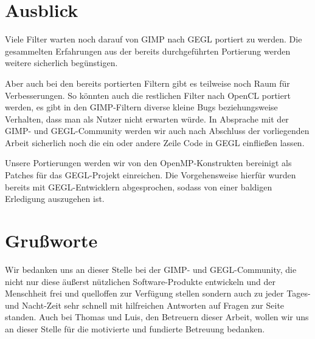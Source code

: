 \documentclass[10pt,a4paper]{article}
\begin{document}
\section{Ausblick}
Viele Filter warten noch darauf von GIMP nach GEGL portiert zu werden. Die gesammelten Erfahrungen aus der bereits durchgeführten Portierung werden weitere sicherlich begünstigen.

Aber auch bei den bereits portierten Filtern gibt es teilweise noch Raum für Verbesserungen. So könnten auch die restlichen Filter nach OpenCL portiert werden, es gibt in den GIMP-Filtern diverse kleine Bugs beziehungsweise Verhalten, dass man als Nutzer nicht erwarten würde. In Absprache mit der GIMP- und GEGL-Community werden wir auch nach Abschluss der vorliegenden Arbeit sicherlich noch die ein oder andere Zeile Code in GEGL einfließen lassen.

Unsere Portierungen werden wir von den OpenMP-Konstrukten bereinigt als Patches für das GEGL-Projekt einreichen. Die Vorgehensweise hierfür wurden bereits mit GEGL-Entwicklern abgesprochen, sodass von einer baldigen Erledigung auszugehen ist.
\section{Grußworte}
Wir bedanken uns an dieser Stelle bei der GIMP- und GEGL-Community, die nicht nur diese äußerst nützlichen Software-Produkte entwickeln und der Menschheit frei und quelloffen zur Verfügung stellen sondern auch zu jeder Tages- und Nacht-Zeit sehr schnell mit hilfreichen Antworten auf Fragen zur Seite standen. Auch bei Thomas und Luis, den Betreuern dieser Arbeit, wollen wir uns an dieser Stelle für die motivierte und fundierte Betreuung bedanken.
\end{document}
